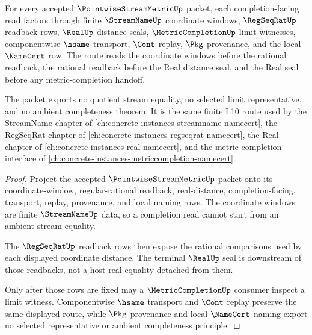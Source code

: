 \begin{theorem}
\label{thm:pointwise-stream-metric-real-completion-route}
For every accepted $\PointwiseStreamMetricUp$ packet, each completion-facing read factors through finite $\StreamNameUp$ coordinate windows, $\RegSeqRatUp$ readback rows, $\RealUp$ distance seals, $\MetricCompletionUp$ limit witnesses, componentwise $\hsame$ transport, $\Cont$ replay, $\Pkg$ provenance, and the local $\NameCert$ row. The route reads the coordinate windows before the rational readback, the rational readback before the Real distance seal, and the Real seal before any metric-completion handoff.

The packet exports no quotient stream equality, no selected limit representative, and no ambient completeness theorem. It is the same finite L10 route used by the StreamName chapter of \autoref{ch:concrete-instances-streamname-namecert}, the RegSeqRat chapter of \autoref{ch:concrete-instances-regseqrat-namecert}, the Real chapter of \autoref{ch:concrete-instances-real-namecert}, and the metric-completion interface of \autoref{ch:concrete-instances-metriccompletion-namecert}.
\end{theorem}
\begin{proof}
Project the accepted $\PointwiseStreamMetricUp$ packet onto its coordinate-window, regular-rational readback, real-distance, completion-facing, transport, replay, provenance, and local naming rows. The coordinate windows are finite $\StreamNameUp$ data, so a completion read cannot start from an ambient stream equality.

The $\RegSeqRatUp$ readback rows then expose the rational comparisons used by each displayed coordinate distance. The terminal $\RealUp$ seal is downstream of those readbacks, not a host real equality detached from them.

Only after those rows are fixed may a $\MetricCompletionUp$ consumer inspect a limit witness. Componentwise $\hsame$ transport and $\Cont$ replay preserve the same displayed route, while $\Pkg$ provenance and local $\NameCert$ naming export no selected representative or ambient completeness principle.
\end{proof}
